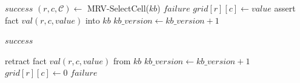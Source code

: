 \begin{algorithm}[H]
\caption{State Space Manager}
\begin{algorithmic}[1]
        \State \Return $success$
    \EndIf
    \State $(r,c,\mathcal{C}) \gets$ MRV-SelectCell($kb$)
        \State \Return $failure$
    \EndIf
        \State $grid[r][c] \gets value$
        \State assert fact $val(r,c,value)$ into $kb$
        \State $kb\_version \gets kb\_version + 1$
        
            \State \Return $success$
        \EndIf
        
        \State retract fact $val(r,c,value)$ from $kb$
        \State $kb\_version \gets kb\_version + 1$
        \State $grid[r][c] \gets 0$
    \EndFor
    \State \Return $failure$
\EndFunction
\end{algorithmic}
\end{algorithm}

\begin{algorithm}[H]
\caption{Inference Interface}
\begin{algorithmic}[1]
    \State \Return {}
\EndFunction
\end{algorithmic}
\end{algorithm}

